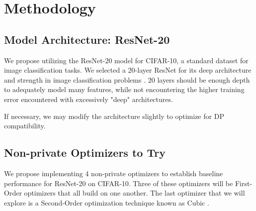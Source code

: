 \documentclass{article}
\begin{document}
    \section{Methodology}\label{sec:methodology}

    \subsection{Model Architecture: ResNet-20}\label{subsec:model-architecture:-resnet-20}

    We propose utilizing the ResNet-20 model \cite{Idelbayev_ResNet20_CIFAR10} for CIFAR-10,
    a standard dataset for image classification tasks.
    We selected a 20-layer ResNet for its deep architecture and strength in image classification problems \cite{DBLP:journals/corr/HeZRS15}. 20
    layers should be enough depth to adequately model many features, while not encountering the higher training error encountered
    with excessively "deep" architectures. \cite{DBLP:journals/corr/HeZRS15}

    If necessary, we may modify the architecture slightly to optimize for DP compatibility.

    \subsection{Non-private Optimizers to Try}\label{subsec:non-private-optimizers-to-try}
    We propose implementing 4 non-private optimizers to establish baseline performance for ResNet-20 on CIFAR-10. Three of these optimizers will be First-Order optimizers 
    that all build on one another. The last optimizer that we will explore is a Second-Order optimization technique known as Cubic .
\end{document}
